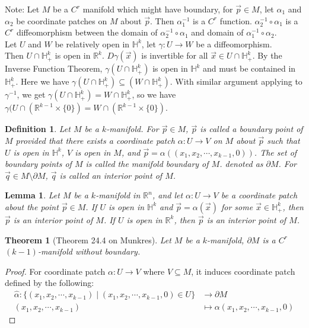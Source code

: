 \documentclass[15pt]{book}
\theoremstyle{break}
\theoremstyle{break}
\newtheorem{thm}{Theorem}[section]
\newtheorem{lem}{Lemma}[thm]
\newtheorem{defn}{Definition}[corL]
\newcommand{\R}{\mathbb{R}}
\newcommand{\note}{\color{red}Note: \color{black}}
\begin{document}
\note Let $M$ be a $C^r$ manifold which might have  boundary, for $\vec{p}\in M$, let $\alpha_1$ and $\alpha_2$ be coordinate patches on $M$ about $\vec{p}$. Then $\alpha_1^{-1}$ is a $C^r$ function. $\alpha_2^{-1}\circ \alpha_1$ is a $C^r$ diffeomorphism between the domain of $\alpha_2^{-1} \circ \alpha_1$ and domain of $\alpha_1^{-1} \circ \alpha_2$. \\

Let $U$ and $W$ be relatively open in $\mathbb{H}^k$, let $\gamma:U \to W$ be a diffeomorphism.\\ 
Then $U \cap \mathbb{H}_+^k$ is open in $\R^k$. $D\gamma(\vec{x})$ is invertible for all $\vec{x}\in U\cap \mathbb{H}_+^k$. By the Inverse Function Theorem, $\gamma(U\cap \mathbb{H}_+^k)$ is open in $\mathbb{H}^k$ and must be contained in $\mathbb{H}_+^k$. Here we have $\gamma(U\cap \mathbb{H}_+^k) \subseteq (W \cap \mathbb{H}_+^k)$. With similar argument applying to $\gamma^{-1}$, we get $\gamma(U \cap \mathbb{H}_+^k) = W \cap \mathbb{H}_+^k$, so we have $\gamma(U\cap (\R^{k-1} \times \{0\}) = W\cap (\R^{k-1} \times \{0\})$. 


\begin{defn}
Let $M$ be a $k$-manifold. For $\vec{p}\in M$, $\vec{p}$ is called a boundary point of $M$ provided that there exists a coordinate patch $\alpha:U \to V$ on $M$ about $\vec{p}$ such that $U$ is open in $\mathbb{H}^k$, $V$ is open in $M$, and $\vec{p} = \alpha((x_1,x_2,\cdots, x_{k-1},0))$. The set of boundary points of $M$ is called the manifold boundary of $M$. denoted as $\partial M$. For $\vec{q}\in M\setminus \partial M$, $\vec{q}$ is called an interior point of $M$. 
\end{defn}

\begin{lem}
Let $M$ be a $k$-manifold in $\R^n$, and let $\alpha:U \to V$ be a coordinate patch about the point $\vec{p}\in M$. If $U$ is open in $\mathbb{H}^k$ and $\vec{p} = \alpha(\vec{x})$ for some $\vec{x}\in \mathbb{H}_+^k$, then $\vec{p}$ is an interior point of $M$. If $U$ is open in $\R^k$, then $\vec{p}$ is an interior point of $M$. 
\end{lem}

\newpage
\begin{thm}[Theorem 24.4 on Munkres]
Let $M$ be a $k$-manifold, $\partial M$ is a $C^r$ $(k-1)$-manifold without boundary.
\end{thm}
\begin{proof}
For coordinate patch $\alpha:U \to V$ where $V \subseteq M$, it induces coordinate patch defined by the following: 
\begin{align*}
\hat{\alpha}: \{(x_1,x_2,\cdots, x_{k-1})\mid (x_1,x_2,\cdots, x_{k-1},0) \in U\}&\to \partial M \\ (x_1,x_2,\cdots, x_{k-1})&\mapsto \alpha(x_1,x_2,\cdots, x_{k-1},0)
\end{align*}
\end{proof}
\end{document}
